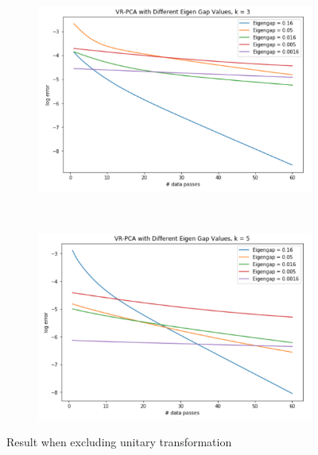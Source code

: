 \documentclass{article}
\begin{document}
\begin{figure}[H]
    \centering
    \begin{subfigure}[h]{\textwidth}
        \centering
        \includegraphics[scale=0.45]{./plot3_1.png}
    \end{subfigure}
    ~
    \begin{subfigure}[h]{\textwidth}
        \centering
        \includegraphics[scale=0.45]{./plot3_2.png}
    \end{subfigure}
    \caption{Result when excluding unitary transformation}
\end{figure}
\end{document}
